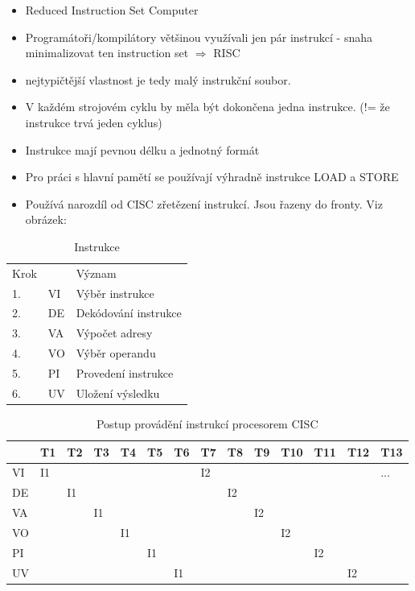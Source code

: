 \documentclass[10pt,a4paper]{article}
\begin{document}
\begin{itemize}
\item Reduced Instruction Set Computer
\item Programátoři/kompilátory většinou využívali jen pár instrukcí - snaha minimalizovat ten instruction set $\Rightarrow$ RISC
\item nejtypičtější vlastnost je tedy malý instrukční soubor.
\item V každém strojovém cyklu by měla být dokončena jedna instrukce. (!= že instrukce trvá jeden cyklus)
\item Instrukce mají pevnou délku a jednotný formát
\item Pro práci s hlavní pamětí se používají výhradně instrukce LOAD a STORE
\item Používá narozdíl od CISC zřetězení instrukcí. Jsou řazeny do fronty. Viz obrázek:
\end{itemize}
\begin{table}[ht]
\centering
\begin{tabular}{l|ll}
\hline
Krok & & Význam               \\
1.& VI & Výběr instrukce      \\
2.& DE & Dekódování instrukce \\
3.& VA & Výpočet adresy       \\
4.& VO & Výběr operandu       \\
5.& PI & Provedení instrukce  \\
6.& UV & Uložení výsledku     \\
\hline
\end{tabular}
\caption{Instrukce}
\label{tab:instrukce}
\end{table}

\begin{table}[ht]
\centering
\begin{tabular}{l|lllllllllllll}
   & T1 & T2 & T3 & T4 & T5 & T6 & T7 & T8 & T9 & T10 & T11 & T12 & T13 \\
   \hline
VI & I1 &    &    &    &    &    & I2 &    &    &     &     &     & ... \\
DE &    & I1 &    &    &    &    &    & I2 &    &     &     &     &     \\
VA &    &    & I1 &    &    &    &    &    & I2 &     &     &     &     \\
VO &    &    &    & I1 &    &    &    &    &    & I2  &     &     &     \\
PI &    &    &    &    & I1 &    &    &    &    &     & I2  &     &     \\
UV &    &    &    &    &    & I1 &    &    &    &     &     & I2  &    
\end{tabular}
\caption{Postup provádění instrukcí procesorem CISC}
\label{tab:instrukceCisc}
\end{table}
\end{document}
